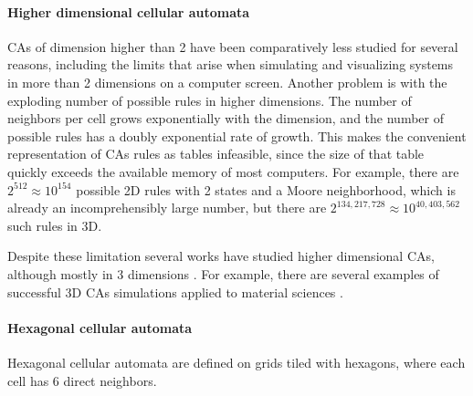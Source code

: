 \paragraph{Higher dimensional cellular automata}
\acp{CA} of dimension higher than 2 have been comparatively less studied for
several reasons, including the limits that arise when simulating and visualizing
systems in more than 2 dimensions on a computer screen. Another problem is with
the exploding number of possible rules in higher dimensions. The number of
neighbors per cell grows exponentially with the dimension, and the number of
possible rules has a doubly exponential rate of growth. This makes the
convenient representation of \acp{CA} rules as tables infeasible, since the size
of that table quickly exceeds the available memory of most computers. For
example, there are $2^{512} \approx 10^{154}$ possible 2D rules with 2 states and a
Moore neighborhood, which is already an incomprehensibly large number, but there
are $2^{134,217,728} \approx 10^{40,403,562}$ such rules in 3D.

Despite these limitation several works have studied higher dimensional \acp{CA},
although mostly in 3 dimensions
\parencite{tsalidesThreedimensionalCellularAutomata1989,
  sudhakaranGrowing3DArtefacts2021}. For example, there are several examples of
successful 3D \acp{CA} simulations applied to material sciences
\parencite{gandin3DCellularAutomaton1997, arataFreeformShapeModeling1999,
  panStudyFailureScale2009, dicaprio3DCellularAutomata2016}.

\paragraph{Hexagonal cellular automata}
Hexagonal cellular automata are defined on grids tiled with hexagons, where each
cell has 6 direct neighbors.

